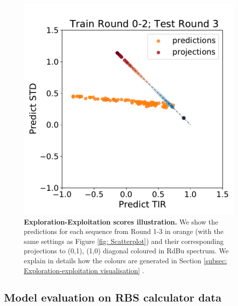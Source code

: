 \documentclass{scrartcl}[2013/05/29]%
\begin{document}
\begin{figure}[!ht]
    \includegraphics[scale=0.35]{plots/Supplementary/proj_scatter_abc1_FF_2.pdf}
   \caption{\textbf{Exploration-Exploitation scores illustration.} We show the predictions for each sequence from Round 1-3 in orange (with the same settings as Figure \mbox{\ref{fig: Scatterplot}}) and their corresponding projections to (0,1), (1,0) diagonal coloured in RdBu spectrum.
    We explain in details how the colours are generated in Section \ref{subsec: Exploration-exploitation visualisation} .
   }
   \label{fig:exploitationvsexplorationdetail}
\end{figure}

\subsection{Model evaluation on RBS calculator data}
\label{subsec: Model evaluation on RBS calculator data}
\end{document}
